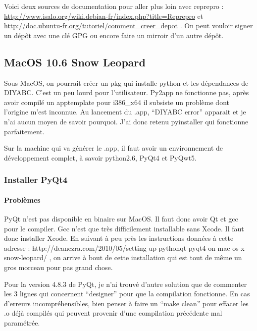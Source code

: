 \documentclass[12pt,a4paper]{article}
\begin{document}
        Voici deux sources de documentation pour aller plus loin avec reprepro
        :\newline
        \url{http://www.isalo.org/wiki.debian-fr/index.php?title=Reprepro}
        et\newline
        \url{http://doc.ubuntu-fr.org/tutoriel/comment_creer_depot} . On peut
        vouloir signer un dépôt avec une clé GPG ou encore faire un mirroir d'un
        autre dépôt.

    \subsection{MacOS 10.6 Snow Leopard}
        Sous MacOS, on pourrait cr\'eer un pkg qui installe python et les
        d\'ependances de DIYABC. C'est un peu lourd pour l'utilisateur. Py2app
        ne fonctionne pas, après avoir compil\'e un apptemplate pour i386\_x64
        il subsiste un problème dont l'origine m'est inconnue. Au lancement du
        .app, ``DIYABC error'' apparait et je n'ai aucun moyen de savoir
        pourquoi. J'ai donc retenu pyinstaller qui fonctionne parfaitement.

        Sur la machine qui va g\'en\'erer le .app, il faut avoir un
        environnement de d\'eveloppement complet, à savoir python2.6, PyQt4 et
        PyQwt5.

        \subsubsection{Installer PyQt4}

        \paragraph{Problèmes}

        PyQt n'est pas disponible en binaire sur MacOS. Il faut donc avoir Qt et
        gcc pour le compiler.  Gcc n'est que très difficilement installable sans
        Xcode. Il faut donc installer Xcode.  En suivant à peu près les
        instructions données à cette adresse : \newline
        http://deanezra.com/2010/05/setting-up-pythonqt-pyqt4-on-mac-os-x-snow-leopard/\newline
        , on arrive à bout de cette installation qui est tout de même un gros
        morceau pour pas grand chose.
    
        Pour la version 4.8.3 de PyQt, je n'ai trouvé d'autre solution que de
        commenter les 3 lignes qui concernent ``designer'' pour que la
        compilation fonctionne. En cas d'erreurs incompréhensibles, bien penser
        à faire un ``make clean'' pour effacer les .o déjà compilés qui peuvent
        provenir d'une compilation précédente mal paramétrée.
\end{document}
